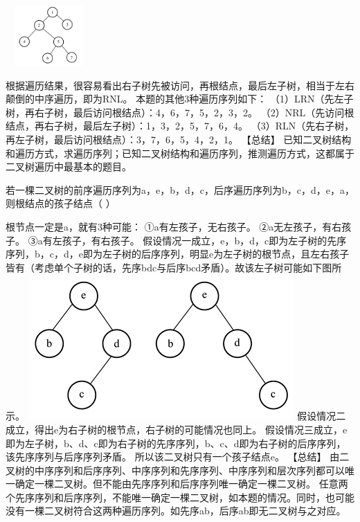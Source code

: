 ~
\includegraphics[width=1.04167in,height=0.90625in]{computerassets/449D7634892FD3CB3AEC7CABC2C24708.png}
\par{}
\begin{solution}根据遍历结果，很容易看出右子树先被访问，再根结点，最后左子树，相当于左右颠倒的中序遍历，即为RNL。
本题的其他3种遍历序列如下：
（1）LRN（先左子树，再右子树，最后访问根结点）：4，6，7，5，2，3，2。
（2）NRL（先访问根结点，再右子树，最后左子树）：1，3，2，5，7，6，4。
（3）RLN（先右子树，再左子树，最后访问根结点）：3，7，6，5，4，2，1。
【总结】
已知二叉树结构和遍历方式，求遍历序列；已知二叉树结构和遍历序列，推测遍历方式，这都属于二叉树遍历中最基本的题目。
\end{solution}
\question 若一棵二叉树的前序遍历序列为a，e，b，d，c，后序遍历序列为b，c，d，e，a，则根结点的孩子结点（
）
\par{}
\begin{solution}根节点一定是a，就有3种可能： ①a有左孩子，无右孩子。
②a无左孩子，有右孩子。 ③a有左孩子，有右孩子。
假设情况一成立，e，b，d，c即为左子树的先序序列，b，c，d，e即为左子树的后序序列，明显e为左子树的根节点，且左右孩子皆有（考虑单个子树的话，先序bdc与后序bcd矛盾）。故该左子树可能如下图所示。
\includegraphics[width=4.00000in,height=2.18750in]{computerassets/8477d425f479b1f532486ea3861e03b0.jpeg}
假设情况二成立，得出e为右子树的根节点，右子树的可能情况也同上。
假设情况三成立，e即为左子树，b、d、c即为右子树的先序序列，b、c、d即为右子树的后序序列，该先序序列与后序序列矛盾。
所以该二叉树只有一个孩子结点e。 【总结】
由二叉树的中序序列和后序序列、中序序列和先序序列、中序序列和层次序列都可以唯一确定一棵二叉树。但不能由先序序列和后序序列唯一确定一棵二叉树。
任意两个先序序列和后序序列，不能唯一确定一棵二叉树，如本题的情况。同时，也可能没有一棵二叉树符合这两种遍历序列。如先序ab，后序ab即无二叉树与之对应。
\end{solution}
